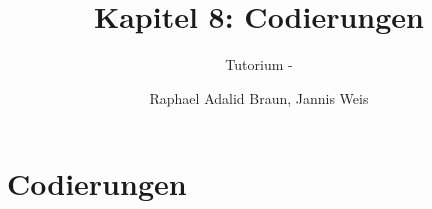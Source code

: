 \documentclass[18pt]{beamer}
\title[Codierungen]{Kapitel 8: Codierungen}
\subtitle{Tutorium - } %
\author{Raphael Adalid Braun, Jannis Weis}
\institute{Grundbegriffe der Informatik | WS 2018/19}
\begin{document}


\begin{frame}
 \titlepage
\end{frame}

\def\showSolutions{1}					 %

\section{Codierungen}
\title[Codierungen]{}

\end{document}
